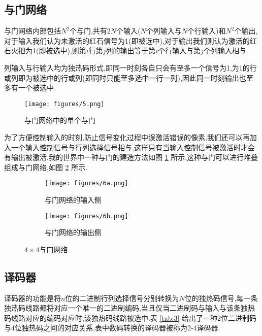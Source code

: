 \documentclass[UTF8,12pt,punct=kaiming,fontset=none]{ctexart}
\begin{document}
\subsection{与门网络}
与门网络内部包括$N^2$个与门,共有$2 N$个输入($N$个列输入与$N$个行输入)和$N^2$个输出,对于输入我们认为未激活的红石信号为1(即被选中),对于输出我们则认为激活的红石火把为1(即被选中),则第$i$行第$j$列的输出等于第$i$个行输入与第$j$个列输入相与.

列输入与行输入均为独热码形式,即同一时刻各自只会有至多一个信号为1,为1的行或列即为被选中的行或列(即同时只能至多选中一行一列),因此同一时刻输出也至多有一个被选中.

\begin{figure}[b]
    \centering
    \texttt{[image: figures/5.png]}
    \caption{与门网络中的单个与门}
    \label{fig:5}
\end{figure}

为了方便控制输入的时刻,防止信号变化过程中误激活错误的像素,我们还可以再加入一个输入控制信号与行列选择信号相与,这样只有当输入控制信号被激活时才会有输出被激活.我的世界中一种与门的建造方法如图 \ref{fig:5} 所示,这种与门可以进行堆叠组成与门网络,如图 \ref{fig:6} 所示.

\begin{figure}[H]
    \centering
    \begin{subfigure}{0.5\linewidth}
        \centering
        \texttt{[image: figures/6a.png]}
        \caption{与门网络的输入侧}
    \end{subfigure}
    \hspace{1cm}
    \begin{subfigure}{0.2\linewidth}
        \centering
        \texttt{[image: figures/6b.png]}
        \caption{与门网络的输出侧}
    \end{subfigure}
    \caption{$4 \times 4$与门网络}
    \label{fig:6}
\end{figure}

\subsection{译码器}
译码器的功能是将$n$位的二进制行列选择信号分别转换为$N$位的独热码信号,每一条独热码线路都将对应一个唯一的二进制编码,当且仅当二进制码与输入与该条独热码线路对应的编码对应时,该独热码线路被选中.表 \ref{tab:3} 给出了一种2位二进制码与4位独热码之间的对应关系,表中数码转换的译码器被称为2-4译码器.
\end{document}
